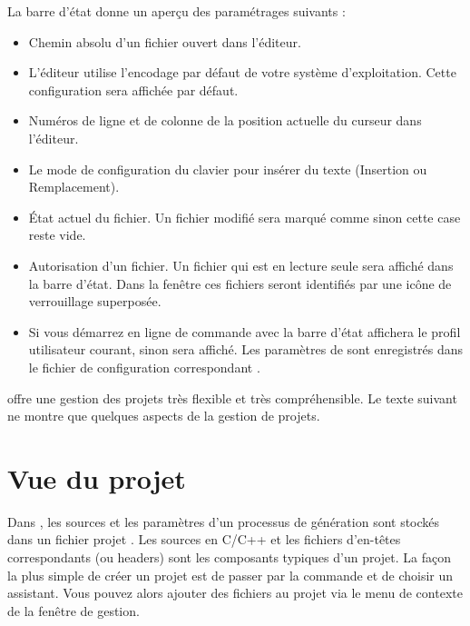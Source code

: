 La barre d'état donne un aperçu des paramétrages suivants :

\begin{itemize}
\item Chemin absolu d'un fichier ouvert dans l'éditeur.
\item L'éditeur utilise l'encodage par défaut de votre système d'exploitation. Cette configuration sera affichée par défaut.
\item Numéros de ligne et de colonne de la position actuelle du curseur dans l'éditeur.
\item Le mode de configuration du clavier pour insérer du texte (Insertion ou Remplacement).
\item État actuel du fichier. Un fichier modifié sera marqué comme  sinon cette case reste vide. 
\item Autorisation d'un fichier. Un fichier qui est en lecture seule sera affiché  dans la barre d'état. Dans la fenêtre  ces fichiers seront identifiés par une icône de verrouillage superposée.


\item Si vous démarrez \codeblocks en ligne de commande avec  la barre d'état affichera le profil utilisateur courant, sinon  sera affiché. Les paramètres de \codeblocks sont enregistrés dans le fichier de configuration correspondant .
\end{itemize}

\codeblocks offre une gestion des projets très flexible et très compréhensible. Le texte suivant ne montre que quelques aspects de la gestion de projets.

\section{Vue du projet}\label{sec:categories}

Dans \codeblocks, les sources et les paramètres d'un processus de génération sont stockés dans un fichier projet . Les sources en C/C++ et les fichiers d'en-têtes correspondants (ou headers) sont les composants typiques d'un projet. La façon la plus simple de créer un projet est de passer par la commande  et de choisir un assistant. Vous pouvez alors ajouter des fichiers au projet via le menu de contexte  de la fenêtre de gestion. 

